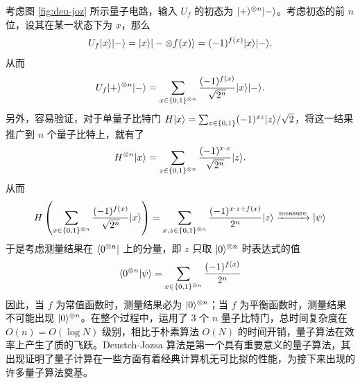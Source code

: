 考虑图 \ref{fig:deu-joz} 所示量子电路，输入 $U_f$ 的初态为 $|+\rangle^{\otimes n}|-\rangle$。考虑初态的前 $n$ 位，设其在某一状态下为 $x$，那么 \begin{align*}
    U_f|x\rangle|-\rangle=|x\rangle|-\otimes f(x)\rangle=(-1)^{f(x)}|x\rangle|-\rangle.
\end{align*}
从而 \begin{align*}
    U_f|+\rangle^{\otimes n}|-\rangle=\sum_{x\in\{0,1\}^{\otimes n}}\frac{(-1)^{f(x)}}{\sqrt{2^n}}|x\rangle|-\rangle.
\end{align*}
另外，容易验证，对于单量子比特门 $H|x\rangle=\sum_{z\in\{0,1\}}(-1)^{xz}|z\rangle/\sqrt{2}$，将这一结果推广到 $n$ 个量子比特上，就有了 \begin{align*}
    H^{\otimes n}|x\rangle=\sum_{z\in\{0,1\}^{\otimes n}}\frac{(-1)^{x\cdot z}}{\sqrt{2^n}}|z\rangle.
\end{align*}
从而 \begin{align*}
    H\left(\sum_{x\in\{0,1\}^{\otimes n}}\frac{(-1)^{f(x)}}{\sqrt{2^n}}|x\rangle\right)=\sum_{x,z\in\{0,1\}^{\otimes n}}\frac{(-1)^{x\cdot z+f(x)}}{2^n}|z\rangle\xrightarrow{\text{measure}}|\psi\rangle
\end{align*}
于是考虑测量结果在 $\langle0^{\otimes n}|$ 上的分量，即 $z$ 只取 $|0\rangle^{\otimes n}$ 时表达式的值 \begin{align*}
    \langle0^{\otimes n}|\psi\rangle=\sum_{x\in\{0,1\}^{\otimes n}}\frac{(-1)^{f(x)}}{2^n}
\end{align*}
因此，当 $f$ 为常值函数时，测量结果必为 $|0\rangle^{\otimes n}$；当 $f$ 为平衡函数时，测量结果不可能出现 $|0\rangle^{\otimes n}$。在整个过程中，运用了 $3$ 个 $n$ 量子比特门，总时间复杂度在 $O(n) = O(\log N)$ 级别，相比于朴素算法 $O(N)$ 的时间开销，量子算法在效率上产生了质的飞跃。Deustch-Jozsa 算法是第一个具有重要意义的量子算法，其出现证明了量子计算在一些方面有着经典计算机无可比拟的性能，为接下来出现的许多量子算法奠基。